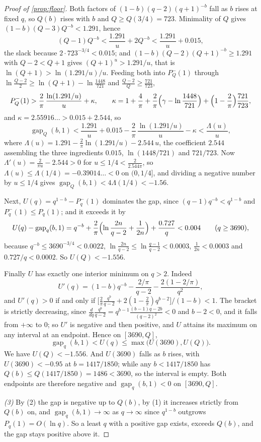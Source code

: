\documentclass[11pt]{amsart}
\theoremstyle{definition}
\theoremstyle{remark}
\begin{document}
\begin{proof}[Proof of \cref{prop:floor}]
Both factors of $(1-b)(q-2)(q+1)^{-b}$ fall as $b$ rises at fixed $q$, so $Q(b)$ rises with $b$ and $Q \ge Q(3/4) = 723$. Minimality of $Q$ gives $(1-b)(Q-3)Q^{-b} < 1.291$, hence
\[
  (Q-1)Q^{-b} < \frac{1.291}{u} + 2Q^{-b} < \frac{1.291}{u} + 0.015 ,
\]
the slack because $2 \cdot 723^{-3/4} < 0.015$; and $(1-b)(Q-2)(Q+1)^{-b} \ge 1.291$ with $Q - 2 < Q+1$ gives $(Q+1)^{u} > 1.291/u$, that is $\ln(Q+1) > \ln(1.291/u)/u$. Feeding both into $P_Q^-(1)$ through $\ln\frac{Q-2}{2} \ge \ln(Q+1) - \ln\frac{1448}{721}$ and $\frac{Q-2}{Q} \ge \frac{721}{723}$,
\[
  P_Q^-(1) > \frac{2}{\pi}\,\frac{\ln(1.291/u)}{u} + \kappa,
  \qquad
  \kappa = 1 + \frac4\pi + \frac2\pi\Bigl( \gamma - \ln\frac{1448}{721} \Bigr) + \Bigl(1 - \frac2\pi\Bigr)\frac{721}{723},
\]
and $\kappa = 2.55916\ldots > 0.015 + 2.544$, so
\[
  \operatorname{gap}_Q(b,1) < \frac{1.291}{u} + 0.015 - \frac{2}{\pi}\,\frac{\ln(1.291/u)}{u} - \kappa < \frac{\Lambda(u)}{u},
\]
where $\Lambda(u) = 1.291 - \frac2\pi \ln(1.291/u) - 2.544\,u$, the coefficient $2.544$ assembling the three ingredients $0.015$, $\ln(1448/721)$ and $721/723$. Now $\Lambda'(u) = \frac{2}{\pi u} - 2.544 > 0$ for $u \le 1/4 < \frac{2}{2.544\pi}$, so $\Lambda(u) \le \Lambda(1/4) = -0.39014\ldots < 0$ on $(0,1/4]$, and dividing a negative number by $u \le 1/4$ gives $\operatorname{gap}_Q(b,1) < 4\Lambda(1/4) < -1.56$.

Next, $U(q) = q^{1-b} - P_q^-(1)$ dominates the gap, since $(q-1)q^{-b} < q^{1-b}$ and $P_q^-(1) \le P_q(1)$; and it exceeds it by
\[
  U(q) - \operatorname{gap}_q(b,1) = q^{-b} + \frac2\pi\Bigl( \ln\frac{2n}{q-2} + \frac{1}{2n} \Bigr) + \frac{0.727}{q} < 0.004
  \qquad (q \ge 3690),
\]
because $q^{-b} \le 3690^{-3/4} < 0.0022$, $\ln\frac{2n}{q-2} \le \ln\frac{q-1}{q-2} < 0.0003$, $\frac{1}{2n} < 0.0003$ and $0.727/q < 0.0002$. So $U(Q) < -1.556$.

Finally $U$ has exactly one interior minimum on $q > 2$. Indeed
\[
  U'(q) = (1-b)q^{-b} - \frac{2/\pi}{q-2} - \frac{2(1 - 2/\pi)}{q^2},
\]
and $U'(q) > 0$ if and only if $\bigl[\frac{2}{\pi} \frac{q^{b}}{q-2} + 2(1 - \frac2\pi) q^{b-2}\bigr]\big/(1-b) < 1$. The bracket is strictly decreasing, since $\frac{d}{dq}\frac{q^b}{q-2} = q^{b-1}\frac{(b-1)q - 2b}{(q-2)^2} < 0$ and $b - 2 < 0$, and it falls from $+\infty$ to $0$; so $U'$ is negative and then positive, and $U$ attains its maximum on any interval at an endpoint. Hence on $[3690, Q]$,
\[
  \operatorname{gap}_q(b,1) < U(q) \le \max\bigl( U(3690), U(Q) \bigr).
\]
We have $U(Q) < -1.556$. And $U(3690)$ falls as $b$ rises, with $U(3690)< -0.95$ at $b = 1417/1850$; while any $b < 1417/1850$ has $Q(b) \le Q(1417/1850) = 1486 < 3690$, so the interval is empty. Both endpoints are therefore negative and $\operatorname{gap}_q(b,1) < 0$ on $[3690, Q]$.

\emph{(3)} By (2) the gap is negative up to $Q(b)$, by (1) it increases strictly from $Q(b)$ on, and $\operatorname{gap}_q(b,1) \to \infty$ as $q \to \infty$ since $q^{1-b}$ outgrows $P_q(1) = O(\ln q)$. So a least $q$ with a positive gap exists, exceeds $Q(b)$, and the gap stays positive above it.
\end{proof}
\end{document}
